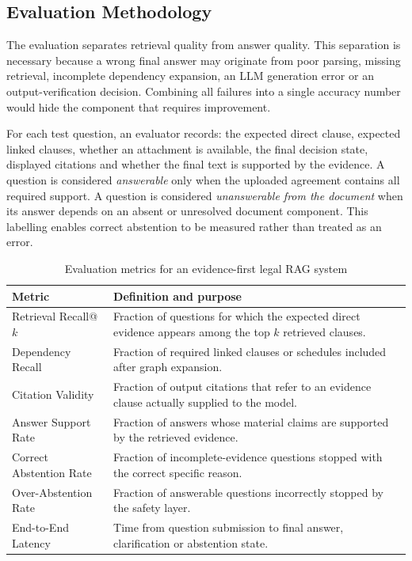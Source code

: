 \documentclass[12pt,a4paper,oneside]{report}
\begin{document}
\subsection{Evaluation Methodology}
The evaluation separates retrieval quality from answer quality. This separation is necessary because a wrong final answer may originate from poor parsing, missing retrieval, incomplete dependency expansion, an LLM generation error or an output-verification decision. Combining all failures into a single accuracy number would hide the component that requires improvement.

For each test question, an evaluator records: the expected direct clause, expected linked clauses, whether an attachment is available, the final decision state, displayed citations and whether the final text is supported by the evidence. A question is considered \emph{answerable} only when the uploaded agreement contains all required support. A question is considered \emph{unanswerable from the document} when its answer depends on an absent or unresolved document component. This labelling enables correct abstention to be measured rather than treated as an error.

\begin{table}[H]
\centering
\begin{tabularx}{\textwidth}{p{}X}
\toprule
\textbf{Metric} & \textbf{Definition and purpose}\\
\midrule
Retrieval Recall@\(k\) & Fraction of questions for which the expected direct evidence appears among the top \(k\) retrieved clauses.\\
Dependency Recall & Fraction of required linked clauses or schedules included after graph expansion.\\
Citation Validity & Fraction of output citations that refer to an evidence clause actually supplied to the model.\\
Answer Support Rate & Fraction of answers whose material claims are supported by the retrieved evidence.\\
Correct Abstention Rate & Fraction of incomplete-evidence questions stopped with the correct specific reason.\\
Over-Abstention Rate & Fraction of answerable questions incorrectly stopped by the safety layer.\\
End-to-End Latency & Time from question submission to final answer, clarification or abstention state.\\
\bottomrule
\end{tabularx}
\caption{Evaluation metrics for an evidence-first legal RAG system}
\end{table}
\end{document}
